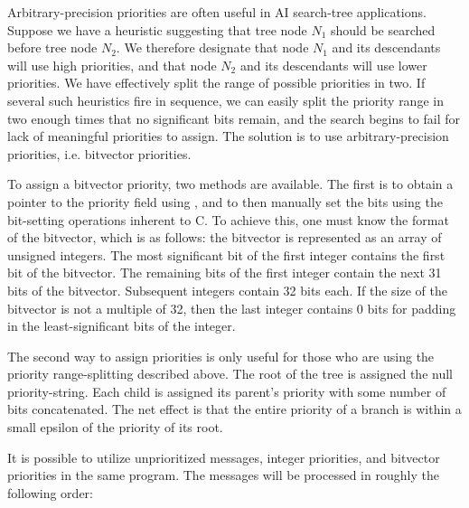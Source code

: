 Arbitrary-precision priorities
are often useful in AI search-tree applications.  Suppose we have a
heuristic suggesting that tree node $N_1$ should be searched before
tree node $N_2$.  We therefore designate that node $N_1$ and its
descendants will use high priorities, and that node $N_2$ and its
descendants will use lower priorities.  We have effectively split the
range of possible priorities in two.  If several such heuristics fire
in sequence, we can easily split the priority range  in two enough times that no significant bits remain,
and the search begins to fail for lack of meaningful priorities to
assign.  The solution is to use arbitrary-precision priorities,
i.e. bitvector priorities.

To assign a bitvector priority, two methods are available.  The
first is to obtain a pointer to the priority field using  ,
and to then manually set the bits using the bit-setting operations
inherent to C.  To achieve this, one must know the format
 of the
bitvector, which is as follows: the bitvector is represented as an
array of unsigned integers.  The most significant bit of the first
integer contains the first bit of the bitvector.  The remaining bits
of the first integer contain the next 31 bits of the bitvector.
Subsequent integers contain 32 bits each.  If the size of the
bitvector is not a multiple of 32, then the last integer contains 0
bits for padding in the least-significant bits of the integer.

The second way to assign priorities is only useful for those who are
using the priority range-splitting
described above.  The root of the tree is assigned the null
priority-string.  Each child is assigned its parent's priority with
some number of bits concatenated.  The net effect is that the entire
priority of a branch is within a small epsilon of the priority of its
root.

It is possible to utilize unprioritized messages, integer priorities,
and bitvector priorities in the same program.  The messages will be
processed in roughly the following order:

